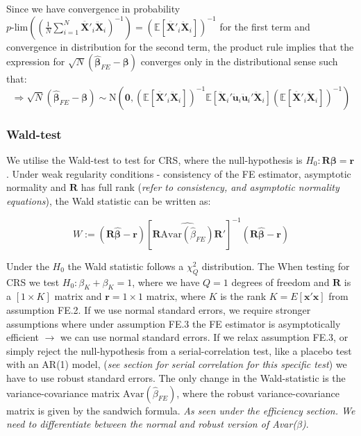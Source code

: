 Since we have convergence in probability $p\text{-lim}\left( \left(\frac{1}{N} \sum_{i=1}^N {\pmb{\ddot{X'}}_{i} \pmb{\ddot{X}}_{i} } \right)^{-1}\right)=(\mathbb{E}[\pmb{\ddot{X'}}_{i} \pmb{\ddot{X}}_{i}])^{-1}$ for the first term and convergence in distribution for the second term, the product rule implies that the expression for $\sqrt{N}(\pmb{\hat{\beta}}_{FE}-\pmb{\beta})$ converges only in the distributional sense such that:
$$\Rightarrow \sqrt{N}(\pmb{\hat{\beta}}_{FE}-\pmb{\beta}) \sim \text{N} \left(\pmb{0},
(\mathbb{E}[\pmb{\ddot{X'}}_{i} \pmb{\ddot{X}}_{i}])^{-1} \mathbb{E}[\pmb{\ddot{X}}_i' \pmb{\ddot{u}}_i\pmb{\ddot{u}}_i'\pmb{\ddot{X}}_i] (\mathbb{E}[\pmb{\ddot{X'}}_{i} \pmb{\ddot{X}}_{i}])^{-1} \right)$$



\subsubsection*{Wald-test}
We utilise the Wald-test to test for CRS, where the null-hypothesis is $H_0: \mathbf{R}\boldsymbol{\beta}=\mathbf{r}$. Under weak regularity conditions - consistency of the FE estimator, asymptotic normality and $\mathbf{R}$ has full rank (\textit{refer to  consistency, and asymptotic normality equations}), the Wald statistic can be written as:


\begin{equation*}
    W:=(\mathbf{R}\widehat{\boldsymbol{\beta}}-\mathbf{r})[\mathbf{R}\widehat{\text{Avar}(\widehat{\beta}_{FE})}\mathbf{R}']^{-1}(\mathbf{R} \boldsymbol{\widehat{\beta}}-\mathbf{r})
\end{equation*}

Under the $H_0$ the Wald statistic follows a $\chi^2_Q$ distribution. The 
When testing for CRS we test $H_0:\beta_K+\beta_K=1$, where we have $Q=1$ degrees of freedom and  $\mathbf{R}$ is a $[1 \times K]$ matrix and $\textbf{r}=1 \times 1$ matrix, where $K$ is the rank $K=E[\textbf{x}'\textbf{x}]$  from assumption FE.2. If we use normal standard errors, we require stronger assumptions where under assumption FE.3 the FE estimator is asymptotically efficient $\rightarrow$ we can use normal standard errors. If we relax assumption FE.3, or simply reject the null-hypothesis from a serial-correlation test, like a placebo test with an AR(1) model, (\textit{see section for serial correlation for this specific test}) we have to use robust standard errors. The only change in the Wald-statistic is the variance-covariance matrix $\text{Avar}(\hat{\beta}_{FE})$, where the robust variance-covariance matrix is given by the sandwich formula. \newline
\textit{As seen under the efficiency section. We need to differentiate between the normal and robust version of Avar($\beta$)}.

